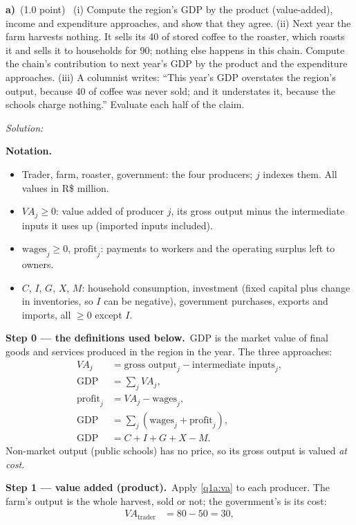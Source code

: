 \documentclass[11pt,a4paper]{article}
\newif\ifsolucoes
\newcommand{\espacoresol}{6cm}
\newcommand{\parte}[2]{\par\Needspace{6\baselineskip}\medskip\noindent\textbf{#1)}~(#2)~}
\newcommand{\resolespaco}{\ifsolucoes\else\par\textit{Solution:}\vspace{\espacoresol}\par\fi}
\newcommand{\passo}[2]{\par\smallskip\noindent\textbf{Step #1.}~#2}
\newenvironment{notacao}{\par\smallskip\noindent\textbf{Notation.}\begin{itemize}[leftmargin=1.4em,topsep=1pt,itemsep=0pt]\small}{\end{itemize}}
\begin{document}
\parte{a}{1.0 point} (i) Compute the region's GDP by the product (value-added), income and expenditure
approaches, and show that they agree. (ii) Next year the farm harvests nothing. It sells its 40 of stored coffee
to the roaster, which roasts it and sells it to households for 90; nothing else happens in this chain. Compute
the chain's contribution to next year's GDP by the product and the expenditure approaches. (iii) A columnist
writes: ``This year's GDP overstates the region's output, because 40 of coffee was never sold; and it understates
it, because the schools charge nothing.'' Evaluate each half of the claim.
\resolespaco
\begin{sol}
\begin{notacao}
\item Trader, farm, roaster, government: the four producers; $j$ indexes them. All values in R\$ million.
\item $VA_j\ge0$: value added of producer $j$, its gross output minus the intermediate inputs it uses up
(imported inputs included).
\item $\text{wages}_j\ge0$, $\text{profit}_j$: payments to workers and the operating surplus left to owners.
\item $C$, $I$, $G$, $X$, $M$: household consumption, investment (fixed capital plus change in inventories,
so $I$ can be negative), government purchases, exports and imports, all $\ge0$ except $I$.
\end{notacao}
\passo{0 --- the definitions used below}{GDP is the market value of final goods and services produced in the
region in the year. The three approaches:
\begin{align}
VA_j &= \text{gross output}_j-\text{intermediate inputs}_j, \label{q1a:va}\\
\text{GDP} &= \textstyle\sum_j VA_j, \label{q1a:prod}\\
\text{profit}_j &= VA_j-\text{wages}_j, \label{q1a:profit}\\
\text{GDP} &= \textstyle\sum_j(\text{wages}_j+\text{profit}_j), \label{q1a:inc}\\
\text{GDP} &= C+I+G+X-M. \label{q1a:exp}
\end{align}
Non-market output (public schools) has no price, so its gross output is valued \emph{at cost}.}
\passo{1 --- value added (product)}{Apply \eqref{q1a:va} to each producer. The farm's output is the whole
harvest, sold or not; the government's is its cost:
\begin{align*}
VA_{\text{trader}} &= 80-50=30,\\

\end{align*}}
\end{sol}
\end{document}

